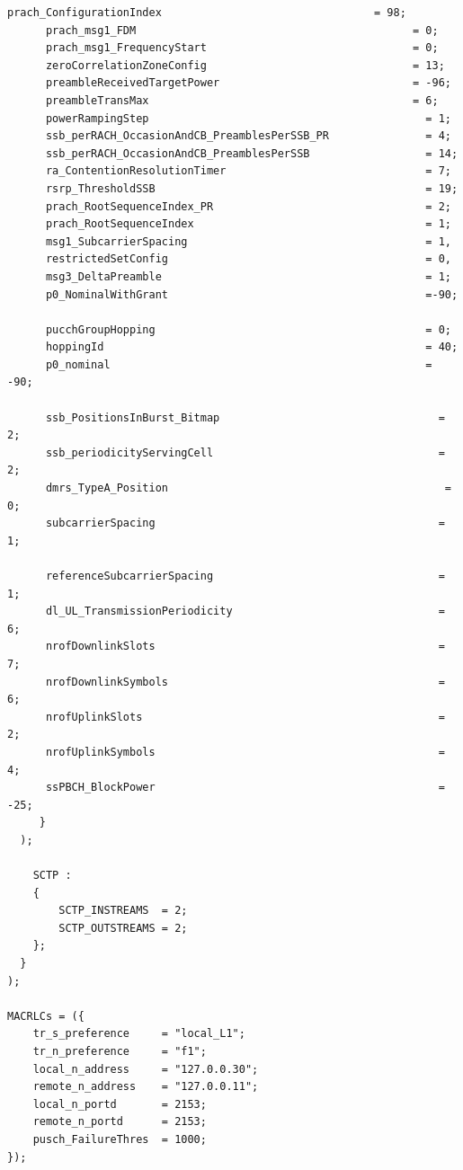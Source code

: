 \begin{lstlisting}[style=confstyle, caption=DU1 band78 PCI 1 Configuration]
      prach_ConfigurationIndex                                 = 98;
      prach_msg1_FDM                                           = 0;
      prach_msg1_FrequencyStart                                = 0;
      zeroCorrelationZoneConfig                                = 13;
      preambleReceivedTargetPower                              = -96;
      preambleTransMax                                         = 6;
      powerRampingStep                                           = 1;
      ssb_perRACH_OccasionAndCB_PreamblesPerSSB_PR               = 4;
      ssb_perRACH_OccasionAndCB_PreamblesPerSSB                  = 14;
      ra_ContentionResolutionTimer                               = 7;
      rsrp_ThresholdSSB                                          = 19;
      prach_RootSequenceIndex_PR                                 = 2;
      prach_RootSequenceIndex                                    = 1;
      msg1_SubcarrierSpacing                                     = 1,
      restrictedSetConfig                                        = 0,
      msg3_DeltaPreamble                                         = 1;
      p0_NominalWithGrant                                        =-90;

      pucchGroupHopping                                          = 0;
      hoppingId                                                  = 40;
      p0_nominal                                                 = -90;

      ssb_PositionsInBurst_Bitmap                                  = 2;
      ssb_periodicityServingCell                                   = 2;
      dmrs_TypeA_Position                                           = 0;
      subcarrierSpacing                                            = 1;

      referenceSubcarrierSpacing                                   = 1;
      dl_UL_TransmissionPeriodicity                                = 6;
      nrofDownlinkSlots                                            = 7;
      nrofDownlinkSymbols                                          = 6;
      nrofUplinkSlots                                              = 2;
      nrofUplinkSymbols                                            = 4;
      ssPBCH_BlockPower                                            = -25;
     }
  );

    SCTP :
    {
        SCTP_INSTREAMS  = 2;
        SCTP_OUTSTREAMS = 2;
    };
  }
);

MACRLCs = ({
    tr_s_preference     = "local_L1";
    tr_n_preference     = "f1";
    local_n_address     = "127.0.0.30";
    remote_n_address    = "127.0.0.11";
    local_n_portd       = 2153;
    remote_n_portd      = 2153;
    pusch_FailureThres  = 1000;
});


\end{lstlisting}
